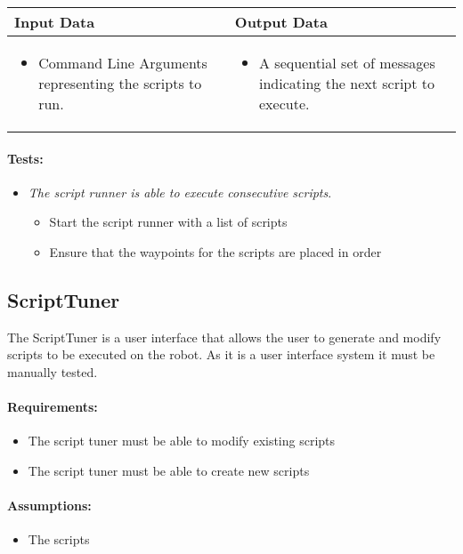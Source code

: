\documentclass[english,12pt]{scrartcl}
\newcounter{testcounter}
\newcommand{\test}[1] {
	\stepcounter{testcounter}
	\item[] \emph{#1}.}
\begin{document}
		\begin{tabular}{p{7cm}|p{7cm}}
			\textbf{Input Data} & \textbf{Output Data} \\ \hline
			\begin{itemize}
				\item Command Line Arguments representing the scripts to run.
			\end{itemize}
			&
			\begin{itemize}
				\item A sequential set of messages indicating the next script to execute.
			\end{itemize}
		\end{tabular}

		\paragraph{Tests:}
		\begin{itemize}
			\test{The script runner is able to execute consecutive scripts}
			\begin{itemize}
				\item Start the script runner with a list of scripts
				\item Ensure that the waypoints for the scripts are placed in order
			\end{itemize}
		\end{itemize}

	\subsection{ScriptTuner}
		The ScriptTuner is a user interface that allows the user to generate and modify scripts to be executed on the robot.
		As it is a user interface system it must be manually tested.

		\paragraph{Requirements:}
		\begin{itemize}
			\item The script tuner must be able to modify existing scripts
			\item The script tuner must be able to create new scripts
		\end{itemize}

		\paragraph{Assumptions:}
		\begin{itemize}
			\item The scripts
		\end{itemize}
\end{document}
